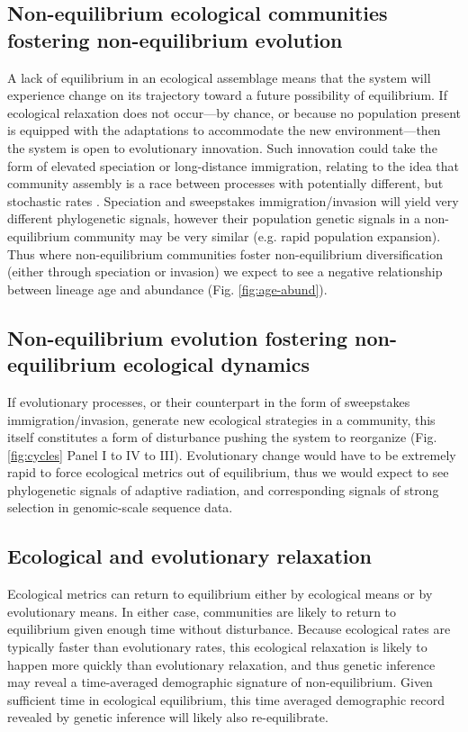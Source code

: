\documentclass[12pt]{article}
\begin{document}
\subsection{Non-equilibrium ecological communities fostering non-equilibrium evolution}

A lack of equilibrium in an ecological assemblage means that the
system will experience change on its trajectory toward a future
possibility of equilibrium. If ecological relaxation does not
occur---by chance, or because no population present is equipped with
the adaptations to accommodate the new environment---then the system is open to
evolutionary innovation.  Such innovation could take the form of
elevated speciation or long-distance immigration, relating to the
idea that community assembly is a race between processes with
potentially different, but stochastic rates \citep{Vanoverbeke2015-ym}. Speciation and
sweepstakes immigration/invasion will yield very different phylogenetic signals,
however their population genetic signals in a non-equilibrium
community may be very similar (e.g. rapid population expansion). Thus
where non-equilibrium communities foster non-equilibrium
diversification (either through speciation or invasion) we expect to
see a negative relationship between lineage age and abundance (Fig.
\ref{fig:age-abund}).

\subsection{Non-equilibrium evolution fostering non-equilibrium ecological dynamics}

If evolutionary processes, or their counterpart in the form of
sweepstakes immigration/invasion, generate new ecological strategies
in a community, this itself constitutes a form of disturbance pushing
the system to reorganize (Fig.
\ref{fig:cycles} Panel I to IV to III).  Evolutionary change would
have to be extremely rapid to force ecological metrics out of
equilibrium, thus we would
expect to see phylogenetic signals of adaptive radiation, and
corresponding signals of strong selection in genomic-scale sequence
data.

\subsection{Ecological and evolutionary relaxation}

Ecological metrics can return to equilibrium either by ecological
means or by evolutionary means. In either case, communities are likely to return to
equilibrium given enough time without disturbance. Because ecological
% 
% 
rates are typically faster than evolutionary rates, this ecological
relaxation is likely to happen more quickly than evolutionary
relaxation, and thus genetic inference may reveal a time-averaged
demographic signature of non-equilibrium. Given sufficient time in ecological equilibrium, this time averaged
demographic record revealed by genetic inference will likely also
re-equilibrate.
\end{document}
